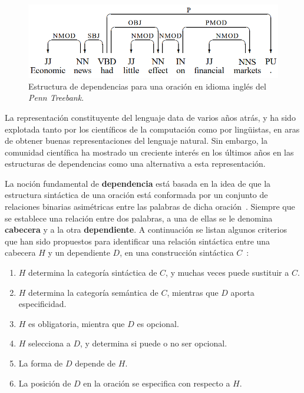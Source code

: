 \begin{figure}[h!]
	\centering
	\includegraphics[width=0.8\linewidth]{Graphics/dep_links.png}
	\caption{Estructura de dependencias para una oración en idioma inglés del \emph{Penn Treebank}.}\label{fig:dep_links}
\end{figure}

La representación constituyente del lenguaje data de varios años atrás, y ha sido explotada tanto por los científicos de la computación como por lingüistas, en aras de obtener buenas representaciones del lenguaje natural. Sin embargo, la comunidad científica ha mostrado un creciente interés en los últimos años en las estructuras de dependencias como una alternativa a esta representación.

La noción fundamental de \textbf{dependencia} está basada en la idea de que la estructura sintáctica de una oración está conformada por un conjunto de relaciones binarias asimétricas entre las palabras de dicha oración~\cite{nivre2005dependency}. Siempre que se establece una relación entre dos palabras, a una de ellas se le denomina \textbf{cabecera} y a la otra \textbf{dependiente}. A continuación se listan algunos criterios que han sido propuestos para identificar una relación sintáctica entre una cabecera $H$ y un dependiente $D$, en una construcción sintáctica $C$~\cite{zwicky1985heads, richard1990english}:

\begin{enumerate}
	\item $H$ determina la categoría sintáctica de $C$, y muchas veces puede sustituir a $C$.
	
	\item $H$ determina la categoría semántica de $C$, mientras que $D$ aporta especificidad.
	
	\item $H$ es obligatoria, mientra que $D$ es opcional.
	
	\item $H$ selecciona a $D$, y determina si puede o no ser opcional.
	
	\item La forma de $D$ depende de $H$.
	
	\item La posición de $D$ en la oración se especifica con respecto a $H$.
\end{enumerate}

